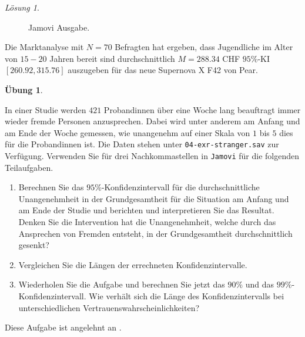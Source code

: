 \documentclass[
]{book}
\providecommand{\tightlist}{%
  \setlength{\itemsep}{0pt}\setlength{\parskip}{0pt}}
\theoremstyle{definition}
\theoremstyle{definition}
\theoremstyle{definition}
\newtheorem{exercise}{Übung}[chapter]
\theoremstyle{definition}
\theoremstyle{remark}
\newtheorem*{solution}{Lösung}
\begin{document}
\begin{solution}
\begin{figure}
{}

\caption{Jamovi Ausgabe.}\label{fig:sol-marktpreisanalyse-output}
\end{figure}

Die Marktanalyse mit \(N = 70\) Befragten hat ergeben, dass Jugendliche im Alter von \(15-20\) Jahren bereit sind durchschnittlich \(M = 288.34\) CHF \(95\%\)-KI \([260.92,315.76]\) auszugeben für das neue Supernova X F42 von Pear.
\end{solution}

\begin{exercise}
\protect\hypertarget{exr:stranger}{}\label{exr:stranger}\leavevmode

In einer Studie werden \(421\) Probandinnen über eine Woche lang beauftragt immer wieder fremde Personen anzusprechen. Dabei wird unter anderem am Anfang und am Ende der Woche gemessen, wie unangenehm auf einer Skala von \(1\) bis \(5\) dies für die Probandinnen ist. Die Daten stehen unter \texttt{04-exr-stranger.sav} zur Verfügung. Verwenden Sie für drei Nachkommastellen in \texttt{Jamovi} für die folgenden Teilaufgaben.

\begin{enumerate}
\def\labelenumi{(\alph{enumi})}
\tightlist
\item
  Berechnen Sie das \(95\%\)-Konfidenzintervall für die durchschnittliche Unangenehmheit in der Grundgesamtheit für die Situation am Anfang und am Ende der Studie und berichten und interpretieren Sie das Resultat. Denken Sie die Intervention hat die Unangenehmheit, welche durch das Ansprechen von Fremden entsteht, in der Grundgesamtheit durchschnittlich gesenkt?
\item
  Vergleichen Sie die Längen der errechneten Konfidenzintervalle.
\item
  Wiederholen Sie die Aufgabe und berechnen Sie jetzt das \(90\%\) und das \(99\%\)-Konfidenzintervall. Wie verhält sich die Länge des Konfidenzintervalls bei unterschiedlichen Vertrauenswahrscheinlichkeiten?
\end{enumerate}

Diese Aufgabe ist angelehnt an \citet{sandstrom2022}.

\end{exercise}
\end{document}
